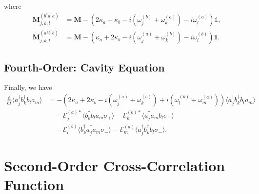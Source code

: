\documentclass{article}
\newcommand{\ddt}[1][]{\frac{\mathrm{d} #1}{\mathrm{d}t}}
\begin{document}
where
\begin{subequations}
	\begin{align}
		\bm{M}_{j, k, l}^{(b^{\dagger} a^{\dagger} a)} &= \bm{M} - \left( 2 \kappa_{a} + \kappa_{b} - i \left( \omega_{j}^{(b)} + \omega_{k}^{(a)} \right) - i \omega_{l}^{(a)} \right) \mathbb{1}, \\
		\bm{M}_{j, k, l}^{(a^{\dagger} b^{\dagger} b)} &= \bm{M} - \left( \kappa_{a} + 2 \kappa_{b} - i \left( \omega_{j}^{(a)} + \omega_{k}^{(b)} \right) - i \omega_{l}^{(b)} \right) \mathbb{1}. 
	\end{align}
\end{subequations}

\subsection{Fourth-Order: Cavity Equation}

Finally, we have
\begin{align}
	\ddt \langle a^{\dagger}_{j} b^{\dagger}_{k} b_{l} a_{m} \rangle &= -\left( 2\kappa_{a} + 2 \kappa_{b} - i \left( \omega_{j}^{(a)} + \omega_{k}^{(b)} \right) + i \left( \omega_{l}^{(b)} + \omega_{m}^{(a)} \right) \right) \langle a^{\dagger}_{j} b^{\dagger}_{k} b_{l} a_{m} \rangle \nonumber \\
	&\quad - \mathcal{E}_{j}^{(a) *} \langle b^{\dagger}_{k} b_{l} a_{m} \sigma_{+} \rangle - \mathcal{E}_{k}^{(b) *} \langle a^{\dagger}_{j} a_{m} b_{l} \sigma_{+} \rangle \nonumber \\
	&\quad - \mathcal{E}_{l}^{(b)} \langle b^{\dagger}_{k} a^{\dagger}_{j} a_{m} \sigma_{-} \rangle - \mathcal{E}_{m}^{(a)} \langle a^{\dagger}_{j} b^{\dagger}_{k} b_{l} \sigma_{-} \rangle.
\end{align}

\section{Second-Order Cross-Correlation Function}
\end{document}
